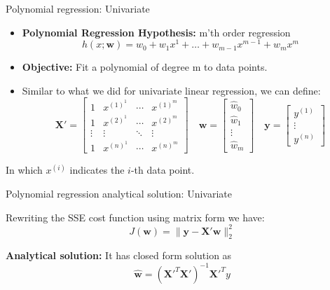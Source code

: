 \documentclass[serif, aspectratio=169]{beamer}
\begin{document}
    \begin{frame}{Polynomial regression: Univariate}
        \begin{itemize}
            \item \textbf{Polynomial Regression Hypothesis:} m'th order regression
            \[
                h(x; \mathbf{w}) = w_0 + w_1 x^1 + \dots + w_{m-1} x^{m-1} + w_m x^m
            \]
            \item \textbf{Objective:} Fit a polynomial of degree m to data points.
        \end{itemize}

        \begin{itemize}
            \item Similar to what we did for univariate linear regression, we can define:
            \[
                \mathbf{X'} =
                \begin{bmatrix}
                    1 & x^{(1)^1} & \cdots & x^{(1)^m} \\
                    1 & x^{(2)^1} & \cdots & x^{(2)^m} \\
                    \vdots & \vdots & \ddots & \vdots \\
                    1 & x^{(n)^1} & \cdots & x^{(n)^m}
                \end{bmatrix}
                \quad
                \mathbf{w} =
                \begin{bmatrix}
                    \hat{w}_0 \\
                    \hat{w}_1 \\
                    \vdots \\
                    \hat{w}_m
                \end{bmatrix}
                \quad
                \mathbf{y} =
                \begin{bmatrix}
                    y^{(1)} \\
                    \vdots \\
                    y^{(n)}
                \end{bmatrix}
            \]
        \end{itemize}
        \begin{center}
            In which \( x^{(i)} \) indicates the \( i \)-th data point.
        \end{center}
    \end{frame}

    \begin{frame}{Polynomial regression analytical solution: Univariate}
        \item Rewriting the SSE cost function using matrix form we have:
        \[
            J(\mathbf{w}) = \| \mathbf{y} - \mathbf{X'} \mathbf{w} \|_2^2
        \]
        \item \textbf{Analytical solution:} It has closed form solution as $$ \hat{\mathbf{w}} = \left( \mathbf{X'}^T\mathbf{X'} \right)^{-1} \mathbf{X'}^T y $$
    \end{frame}
\end{document}
